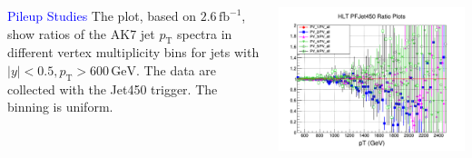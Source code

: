 \documentclass[t,professionalfonts,handout, xcolor=pdftex,dvipsnames,table]{beamer}
\begin{document}
\begin{frame}
\begin{columns}[T]
\begin{column}{0.35\textwidth}
\textcolor{blue}{Pileup Studies} The plot, based on 
$2.6\,\textrm{fb}^{-1}$, show ratios of the AK7 jet $p_\textrm{T}$ spectra
in different vertex multiplicity bins for jets with $|y| < 0.5, p_{\textrm{T}} > 600\,\textrm{GeV}$.
The data are collected with the Jet450 trigger. The binning is uniform.
\end{column}
\begin{column}{0.65\textwidth}
\centerline{
\includegraphics[width=\textwidth]{RatioJet450.pdf}
}
\end{column}
\end{columns}
\end{frame}
\end{document}
